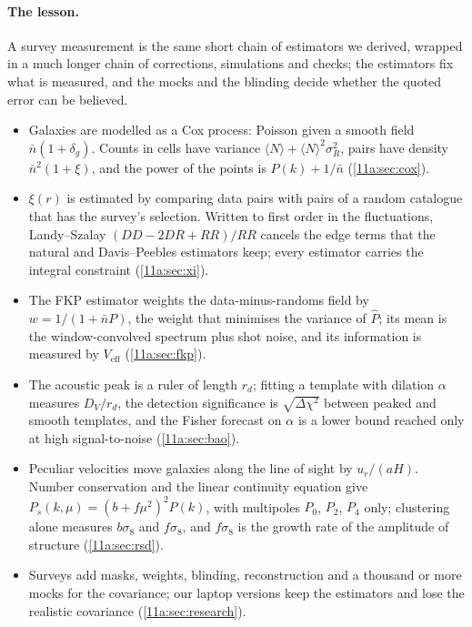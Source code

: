 \paragraph{The lesson.}
A survey measurement is the same short chain of estimators we derived, wrapped
in a much longer chain of corrections, simulations and checks; the estimators
fix what is measured, and the mocks and the blinding decide whether the quoted
error can be believed.

\begin{recap}
\begin{itemize}[leftmargin=1.2em,itemsep=2pt]
  \item Galaxies are modelled as a Cox process: Poisson given a smooth field
        $\bar n(1+\delta_g)$. Counts in cells have variance
        $\langle N\rangle+\langle N\rangle^2\sigma_R^2$, pairs have density
        $\bar n^2(1+\xi)$, and the power of the points is $P(k)+1/\bar n$
        (\cref{11a:sec:cox}).
  \item $\xi(r)$ is estimated by comparing data pairs with pairs of a random
        catalogue that has the survey's selection. Written to first order in the
        fluctuations, Landy--Szalay $(DD-2DR+RR)/RR$ cancels the edge terms that
        the natural and Davis--Peebles estimators keep; every estimator carries the
        integral constraint (\cref{11a:sec:xi}).
  \item The FKP estimator weights the data-minus-randoms field by
        $w=1/(1+\bar nP)$, the weight that minimises the variance of $\hat P$;
        its mean is the window-convolved spectrum plus shot noise, and its
        information is measured by $V_{\mathrm{eff}}$ (\cref{11a:sec:fkp}).
  \item The acoustic peak is a ruler of length $r_d$; fitting a template with
        dilation $\alpha$ measures $D_V/r_d$, the detection significance is
        $\sqrt{\Delta\chi^2}$ between peaked and smooth templates, and the Fisher
        forecast on $\alpha$ is a lower bound reached only at high
        signal-to-noise (\cref{11a:sec:bao}).
  \item Peculiar velocities move galaxies along the line of sight by
        $u_r/(aH)$. Number conservation and the linear continuity equation give
        $P_s(k,\mu)=(b+f\mu^2)^2P(k)$, with multipoles $P_0$, $P_2$, $P_4$ only;
        clustering alone measures $b\sigma_8$ and $f\sigma_8$, and $f\sigma_8$ is
        the growth rate of the amplitude of structure (\cref{11a:sec:rsd}).
  \item Surveys add masks, weights, blinding, reconstruction and a thousand or
        more mocks for the covariance; our laptop versions keep the estimators
        and lose the realistic covariance (\cref{11a:sec:research}).
\end{itemize}
\end{recap}
